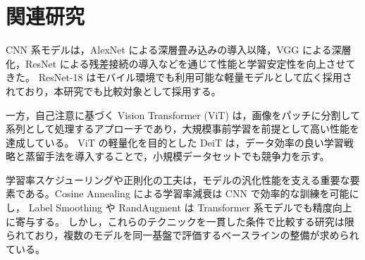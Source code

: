 \section{関連研究}\label{sec:related}
CNN 系モデルは，AlexNet による深層畳み込みの導入以降，VGG による深層化，ResNet による残差接続の導入などを通じて性能と学習安定性を向上させてきた。\cite{krizhevsky2012imagenet,simonyan2014very,he2016deep} ResNet-18 はモバイル環境でも利用可能な軽量モデルとして広く採用されており，本研究でも比較対象として採用する。

一方，自己注意に基づく Vision Transformer (ViT) は，画像をパッチに分割して系列として処理するアプローチであり，大規模事前学習を前提として高い性能を達成している。\cite{dosovitskiy2021an} ViT の軽量化を目的とした DeiT は，データ効率の良い学習戦略と蒸留手法を導入することで，小規模データセットでも競争力を示す。\cite{touvron2021training}

学習率スケジューリングや正則化の工夫は，モデルの汎化性能を支える重要な要素である。Cosine Annealing による学習率減衰は CNN で効率的な訓練を可能にし，\cite{loshchilov2017sgdr} Label Smoothing や RandAugment は Transformer 系モデルでも精度向上に寄与する。\cite{muller2019does,cubuk2020randaugment} しかし，これらのテクニックを一貫した条件で比較する研究は限られており，複数のモデルを同一基盤で評価するベースラインの整備が求められている。
